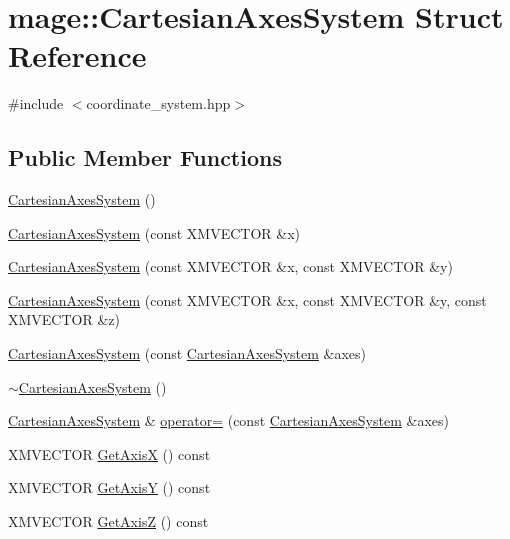 \hypertarget{structmage_1_1_cartesian_axes_system}{}\section{mage\+:\+:Cartesian\+Axes\+System Struct Reference}
\label{structmage_1_1_cartesian_axes_system}


{\ttfamily \#include $<$coordinate\+\_\+system.\+hpp$>$}

\subsection*{Public Member Functions}
\begin{DoxyCompactItemize}
\item 
\hyperlink{structmage_1_1_cartesian_axes_system_a8f6ebcd50aafda44c478b7aa25e1fd25}{Cartesian\+Axes\+System} ()
\item 
\hyperlink{structmage_1_1_cartesian_axes_system_afd22b658e9221086add8c41958394568}{Cartesian\+Axes\+System} (const X\+M\+V\+E\+C\+T\+OR \&x)
\item 
\hyperlink{structmage_1_1_cartesian_axes_system_a8c5931061f227f6df8eec9ac8b9a7a18}{Cartesian\+Axes\+System} (const X\+M\+V\+E\+C\+T\+OR \&x, const X\+M\+V\+E\+C\+T\+OR \&y)
\item 
\hyperlink{structmage_1_1_cartesian_axes_system_a6d33ce6d7112d0cb63d93693036b986a}{Cartesian\+Axes\+System} (const X\+M\+V\+E\+C\+T\+OR \&x, const X\+M\+V\+E\+C\+T\+OR \&y, const X\+M\+V\+E\+C\+T\+OR \&z)
\item 
\hyperlink{structmage_1_1_cartesian_axes_system_a741e121fcddeda926a71961ec4e5c308}{Cartesian\+Axes\+System} (const \hyperlink{structmage_1_1_cartesian_axes_system}{Cartesian\+Axes\+System} \&axes)
\item 
\hyperlink{structmage_1_1_cartesian_axes_system_a1839e7f85ba5cc28f99c8b5d7bfd27eb}{$\sim$\+Cartesian\+Axes\+System} ()
\item 
\hyperlink{structmage_1_1_cartesian_axes_system}{Cartesian\+Axes\+System} \& \hyperlink{structmage_1_1_cartesian_axes_system_ad86c9b070b23e4ba1a6bc0543d1189bc}{operator=} (const \hyperlink{structmage_1_1_cartesian_axes_system}{Cartesian\+Axes\+System} \&axes)
\item 
X\+M\+V\+E\+C\+T\+OR \hyperlink{structmage_1_1_cartesian_axes_system_aa8e41490a0f9b333a8a9dde3a7544624}{Get\+AxisX} () const
\item 
X\+M\+V\+E\+C\+T\+OR \hyperlink{structmage_1_1_cartesian_axes_system_a1ab9d19fa733ce9667b244cd4a03b8fc}{Get\+AxisY} () const
\item 
X\+M\+V\+E\+C\+T\+OR \hyperlink{structmage_1_1_cartesian_axes_system_a143811599a089100b0327e719db44ec5}{Get\+AxisZ} () const
\end{DoxyCompactItemize}

